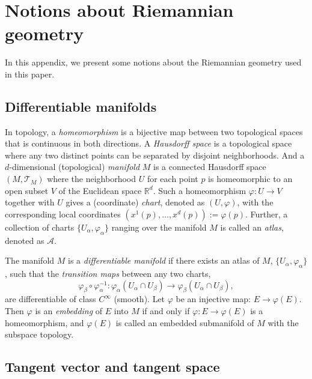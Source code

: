 \documentclass[12pt]{article}
\begin{document}
\hypertarget{riemgeo}{%
\section{Notions about Riemannian geometry}\label{riemgeo}}

In this appendix, we present some notions about the Riemannian geometry used in this paper.

\hypertarget{differentiable-manifolds}{%
\subsection{Differentiable manifolds}\label{differentiable-manifolds}}

In topology, a \emph{homeomorphism} is a bijective map between two topological spaces that is continuous in both directions. A \emph{Hausdorff space} is a topological space where any two distinct points can be separated by disjoint neighborhoods. And a \(d\)-dimensional (topological) \emph{manifold} \(M\) is a connected Hausdorff space \((M, \mathcal{T}_M)\) where the neighborhood \(U\) for each point \(p\) is homeomorphic to an open subset \(V\) of the Euclidean space \(\mathbb{R}^d\). Such a homeomorphism \(\varphi: U \rightarrow V\) together with \(U\) gives a (coordinate) \emph{chart}, denoted as \((U, \varphi)\), with the corresponding local coordinates \((x^1(p),\dots, x^d(p)) := \varphi(p)\). Further, a collection of charts \(\{U_\alpha, \varphi_\alpha\}\) ranging over the manifold \(M\) is called an \emph{atlas}, denoted as \(\mathcal{A}\).

The manifold \(M\) is a \emph{differentiable manifold} if there exists an atlas of \(M\), \(\{U_\alpha, \varphi_\alpha\}\), such that the \emph{transition maps} between any two charts,
\[
\varphi_\beta \circ \varphi_\alpha^{-1}: \varphi_\alpha(U_\alpha \cap U_\beta) \rightarrow \varphi_\beta(U_\alpha \cap U_\beta),
\] are differentiable of class \(C^\infty\) (smooth).
Let \(\varphi\) be an injective map: \(E \rightarrow \varphi(E)\). Then \(\varphi\) is an \emph{embedding} of \(E\) into \(M\) if and only if
\(\varphi: E \rightarrow \varphi(E)\) is a homeomorphism, and \(\varphi(E)\) is called an embedded submanifold of \(M\) with the subspace topology.

\hypertarget{tangent-vector-and-tangent-space}{%
\subsection{Tangent vector and tangent space}\label{tangent-vector-and-tangent-space}}
\end{document}
